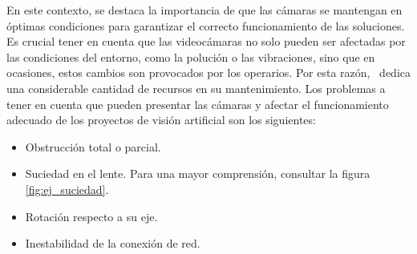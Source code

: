 \documentclass[
11pt, %
]{charter}
\begin{document}
En este contexto, se destaca la importancia de que las cámaras se mantengan en óptimas condiciones para garantizar el correcto funcionamiento de las soluciones. Es crucial tener en cuenta que las videocámaras no solo pueden ser afectadas por las condiciones del entorno, como la polución o las vibraciones, sino que en ocasiones, estos cambios son provocados por los operarios. Por esta razón, \empclientename\ dedica una considerable cantidad de recursos en su mantenimiento. Los problemas a tener en cuenta que pueden presentar las cámaras y afectar el funcionamiento adecuado de los proyectos de visión artificial son los siguientes:
\begin{itemize}
    \item Obstrucción total o parcial.
    \item Suciedad en el lente. Para una mayor comprensión, consultar la figura \ref{fig:ej_suciedad}.
    \item Rotación respecto a su eje. 
    \item Inestabilidad de la conexión de red.
\end{itemize}
\end{document}
